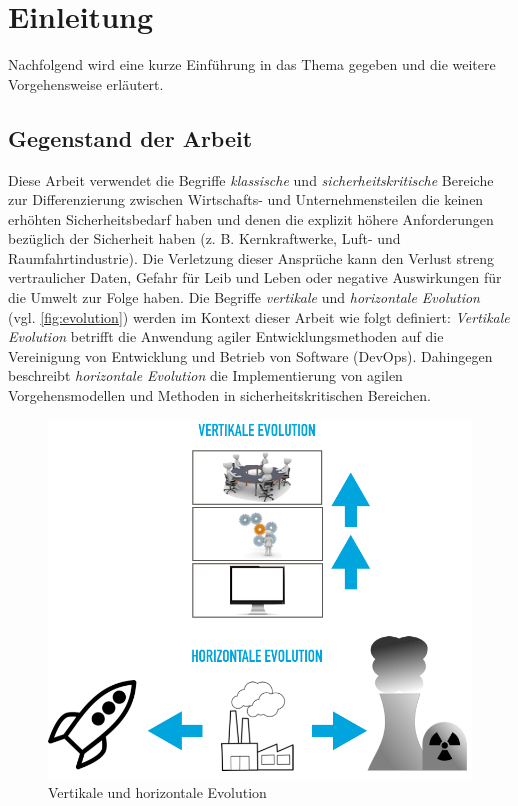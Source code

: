 \chapter{Einleitung} %

Nachfolgend wird eine kurze Einführung in das Thema gegeben und die weitere Vorgehensweise erläutert.

\section{Gegenstand der Arbeit}

Diese Arbeit verwendet die Begriffe \emph{klassische} und \emph{sicherheitskritische} Bereiche zur Differenzierung zwischen Wirtschafts- und Unternehmensteilen die keinen erhöhten Sicherheitsbedarf haben und denen die explizit höhere Anforderungen bezüglich der Sicherheit haben (z. B. Kernkraftwerke, Luft- und Raumfahrtindustrie).
Die Verletzung dieser Ansprüche kann den Verlust streng vertraulicher Daten, Gefahr für Leib und Leben oder negative Auswirkungen für die Umwelt zur Folge haben.
Die Begriffe \emph{vertikale} und \emph{horizontale Evolution} (vgl. \autoref{fig:evolution}) werden im Kontext dieser Arbeit wie folgt definiert:
\emph{Vertikale Evolution} betrifft die Anwendung agiler Entwicklungsmethoden auf die Vereinigung von Entwicklung und Betrieb von Software (DevOps).
Dahingegen beschreibt \emph{horizontale Evolution} die Implementierung von agilen Vorgehensmodellen und Methoden in sicherheitskritischen Bereichen.

\begin{figure}
  \centering
  \includegraphics[width=\textwidth]{img/evolution.png}
  \caption{Vertikale und horizontale Evolution}
  \label{fig:evolution}
\end{figure}

